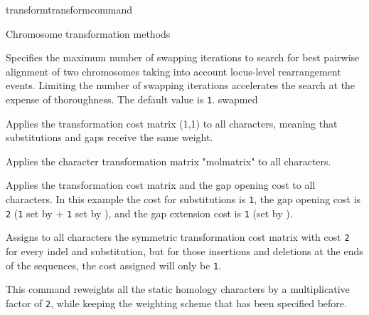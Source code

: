 \begin{command}{transform}{transformcommand}
\begin{arguments}
\begin{argumentgroup}{Chromosome transformation methods}
\begin{description}
                        {Specifies the maximum number of swapping iterations
                        to search for best pairwise alignment of two chromosomes
                        taking into account locus-level rearrangement events. Limiting the number of swapping
                        iterations accelerates the search at the expense of
                        thoroughness. The default value is \texttt{1}.}
                        {swapmed}

       
            \end{description}
        \end{argumentgroup}
	\end{arguments}
	


	\begin{poyexamples} 
             	{Applies the transformation cost matrix (1,1) to all characters,
             	meaning that substitutions and gaps receive the same weight.}

           	 {Applies the character transformation matrix "molmatrix" to all
            	characters.}
            	
		
		{Applies the transformation cost matrix and the gap opening cost
		to all characters. In this example the cost for substitutions is \texttt{1},
		the gap opening cost is \texttt{2} (\texttt{1} set by 
		+ \texttt{1} set by ), and the gap extension cost is \texttt{1}
		(set by ).}
		
		{Assigns to all characters the symmetric transformation cost
		matrix with cost \texttt{2} for every indel and substitution, but for those
		insertions and deletions at the ends of the sequences, the cost
		assigned will only be \texttt{1}.}
		
            	{This command reweights all the static homology characters
            	by a multiplicative factor of \texttt{2}, while keeping the weighting
            	scheme that has been specified before.}
		

\end{poyexamples}
\end{command}
